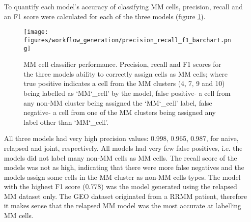 To quantify each model's accuracy of classifying MM cells, precision, recall and an F1 score were calculated for each of the three models (figure \ref{fig:mm_class_accuracy_bar}).
%
\begin{figure}[htb]
\centering
\texttt{[image: figures/workflow\_generation/precision\_recall\_f1\_barchart.png]}
\caption[MM classifier accuracy]{MM cell classifier performance.
Precision, recall and F1 scores for the three models ability to correctly assign cells as MM cells; where true positive indicates a cell from the MM clusters (4, 7, 9 and 10) being labelled as `MM\char`_cell' by the model, false positive- a cell from any non-MM cluster being assigned the `MM\char`_cell' label, false negative- a cell from one of the MM clusters being assigned any label other than `MM\char`_cell'.
}
\label{fig:mm_class_accuracy_bar}
\end{figure}
%
All three models had very high precision values: 0.998, 0.965, 0.987, for naive, relapsed and joint, respectively.
All models had very few false positives, i.e. the models did not label many non-MM cells as MM cells.
The recall score of the models was not as high, indicating that there were more false negatives and the models assign some cells in the MM cluster as non-MM cells types.
The model with the highest F1 score (0.778) was the model generated using the relapsed MM dataset only.
The GEO dataset originated from a RRMM patient, therefore it makes sense that the relapsed MM model was the most accurate at labelling MM cells.

